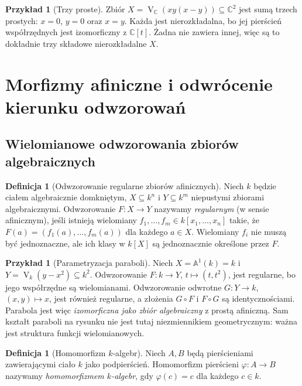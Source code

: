 \documentclass[11pt,a4paper,openany]{report}
\numberwithin{equation}{section}
\theoremstyle{plain}
\theoremstyle{definition}
\newtheorem{definicja}[twierdzenie]{Definicja}
\newtheorem{przyklad}[twierdzenie]{Przykład}
\theoremstyle{remark}
\newcommand{\C}{\mathbb C}
\newcommand{\A}{\mathbb A}
\newcommand{\V}{\operatorname V}
\begin{document}
\begin{przyklad}[Trzy proste]
Zbiór $X=\V_{\C}(xy(x-y))\subseteq\C^2$
jest sumą trzech prostych: $x=0$, $y=0$ oraz $x=y$.
Każda jest nierozkładalna, bo jej pierścień współrzędnych
jest izomorficzny z $\C[t]$. Żadna nie zawiera innej,
więc są to dokładnie trzy składowe nierozkładalne $X$.
\end{przyklad}

\section{Morfizmy afiniczne i odwrócenie kierunku odwzorowań}

\subsection{Wielomianowe odwzorowania zbiorów algebraicznych}

\begin{definicja}[Odwzorowanie regularne zbiorów afinicznych]
Niech $k$ będzie ciałem algebraicznie domkniętym,
$X\subseteq k^n$ i $Y\subseteq k^m$ niepustymi zbiorami algebraicznymi.
Odwzorowanie $F:X\to Y$ nazywamy \emph{regularnym} (w sensie
afinicznym), jeśli istnieją wielomiany
$f_1,\dots,f_m\in k[x_1,\dots,x_n]$ takie, że
$F(a)=(f_1(a),\dots,f_m(a))$ dla każdego $a\in X$.
Wielomiany $f_i$ nie muszą być jednoznaczne, ale ich klasy w $k[X]$
są jednoznacznie określone przez $F$.
\end{definicja}

\begin{przyklad}[Parametryzacja paraboli]
Niech $X=\A^1(k)=k$ i
$Y=\V_k(y-x^2)\subseteq k^2$.
Odwzorowanie $F:k\to Y$, $t\mapsto(t,t^2)$, jest regularne,
bo jego współrzędne są wielomianami. Odwzorowanie odwrotne
$G:Y\to k$, $(x,y)\mapsto x$, jest również regularne,
a złożenia $G\circ F$ i $F\circ G$ są identycznościami.
Parabola jest więc \emph{izomorficzna jako zbiór algebraiczny}
z prostą afiniczną. Sam kształt paraboli na rysunku nie jest
tutaj niezmiennikiem geometrycznym: ważna jest struktura funkcji
wielomianowych.
\end{przyklad}

\begin{definicja}[Homomorfizm $k$-algebr]
Niech $A,B$ będą pierścieniami zawierającymi ciało $k$ jako podpierścień.
Homomorfizm pierścieni $\varphi:A\to B$ nazywamy
\emph{homomorfizmem $k$-algebr}, gdy $\varphi(c)=c$
dla każdego $c\in k$.
\end{definicja}
\end{document}
